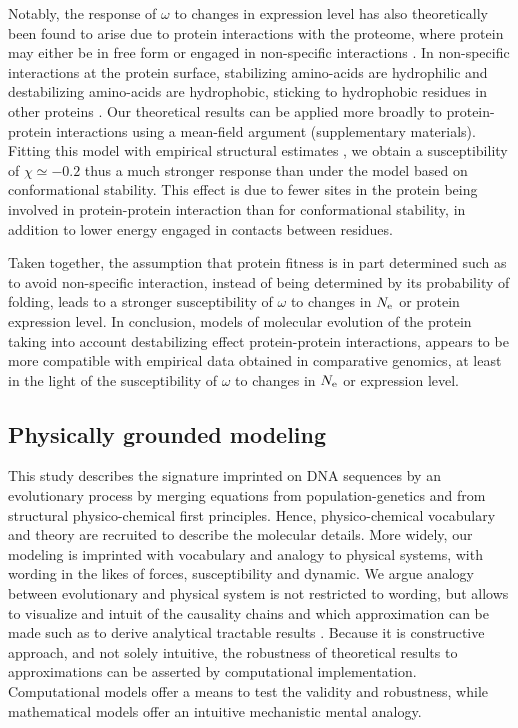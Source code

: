 Notably, the response of $\omega$ to changes in expression level has also theoretically been found to arise due to protein interactions with the proteome, where protein may either be in free form or engaged in non-specific interactions \citep{Yang2012, Zhang2013}.
In non-specific interactions at the protein surface, stabilizing amino-acids are hydrophilic and destabilizing amino-acids are hydrophobic, sticking to hydrophobic residues in other proteins \citep{Dixit2013,Manhart2015}.
Our theoretical results can be applied more broadly to protein-protein interactions using a mean-field argument (supplementary materials).
Fitting this model with empirical structural estimates \citep{Janin1995a, Zhang2008}, we obtain a susceptibility of $\chi \simeq -0.2$ thus a much stronger response than under the model based on conformational stability.
This effect is due to fewer sites in the protein being involved in protein-protein interaction than for conformational stability, in addition to lower energy engaged in contacts between residues.

Taken together, the assumption that protein fitness is in part determined such as to avoid non-specific interaction, instead of being determined by its probability of folding, leads to a stronger susceptibility of $\omega$ to changes in $N_{\mathrm{e}}$ or protein expression level.
In conclusion, models of molecular evolution of the protein taking into account destabilizing effect protein-protein interactions, appears to be more compatible with empirical data obtained in comparative genomics, at least in the light of the susceptibility of $\omega$ to changes in $N_{\mathrm{e}}$ or expression level.

\subsection{Physically grounded modeling}
This study describes the signature imprinted on \acrshort{DNA} sequences by an evolutionary process by merging equations from population-genetics and from structural physico-chemical first principles.
Hence, physico-chemical vocabulary and theory are recruited to describe the molecular details.
More widely, our modeling is imprinted with vocabulary and analogy to physical systems, with wording in the likes of forces, susceptibility and dynamic.
We argue analogy between evolutionary and physical system is not restricted to wording, but allows to visualize and intuit of the causality chains and which approximation can be made such as to derive analytical tractable results \cite{Sella2005, Mustonen2009, Bastolla2012, Bastolla2017}.
Because it is constructive approach, and not solely intuitive, the robustness of theoretical results to approximations can be asserted by computational implementation. 
Computational models offer a means to test the validity and robustness, while mathematical models offer an intuitive mechanistic mental analogy.


